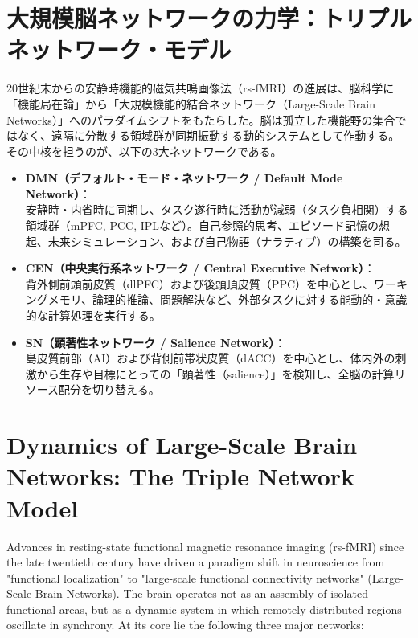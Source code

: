 \ifja
    \chapter{大規模脳ネットワークの力学：トリプルネットワーク・モデル}

    20世紀末からの安静時機能的磁気共鳴画像法（rs-fMRI）の進展は、脳科学に「機能局在論」から「大規模機能的結合ネットワーク（Large-Scale Brain Networks）」へのパラダイムシフトをもたらした。脳は孤立した機能野の集合ではなく、遠隔に分散する領域群が同期振動する動的システムとして作動する。
    その中核を担うのが、以下の3大ネットワークである。

    \begin{itemize}
        \item \textbf{DMN（デフォルト・モード・ネットワーク / Default Mode Network）}：\\
            安静時・内省時に同期し、タスク遂行時に活動が減弱（タスク負相関）する領域群（mPFC, PCC, IPLなど）。自己参照的思考、エピソード記憶の想起、未来シミュレーション、および自己物語（ナラティブ）の構築を司る。
        \item \textbf{CEN（中央実行系ネットワーク / Central Executive Network）}：\\
            背外側前頭前皮質（dlPFC）および後頭頂皮質（PPC）を中心とし、ワーキングメモリ、論理的推論、問題解決など、外部タスクに対する能動的・意識的な計算処理を実行する。
        \item \textbf{SN（顕著性ネットワーク / Salience Network）}：\\
            島皮質前部（AI）および背側前帯状皮質（dACC）を中心とし、体内外の刺激から生存や目標にとっての「顕著性（salience）」を検知し、全脳の計算リソース配分を切り替える。
    \end{itemize}
\else
    \chapter{Dynamics of Large-Scale Brain Networks: The Triple Network Model}

    Advances in resting-state functional magnetic resonance imaging (rs-fMRI) since the late twentieth century have driven a paradigm shift in neuroscience from "functional localization" to "large-scale functional connectivity networks" (Large-Scale Brain Networks). The brain operates not as an assembly of isolated functional areas, but as a dynamic system in which remotely distributed regions oscillate in synchrony.
    At its core lie the following three major networks:

